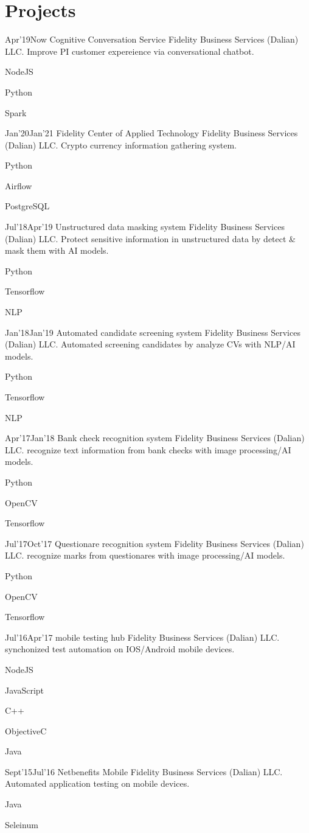 \documentclass[]{lubricy-cv}
\begin{document}
\section{Projects}
\begin{entrylist}
  \entry
    {Apr'19}{Now}
    {Cognitive Conversation Service}
    {Fidelity Business Services (Dalian) LLC.}
    {Improve PI customer expereience via conversational chatbot.}
    {
      \item NodeJS
      \item Python
      \item Spark }
  \entry
    {Jan'20}{Jan'21}
    {Fidelity Center of Applied Technology}
    {Fidelity Business Services (Dalian) LLC.}
    {Crypto currency information gathering system.}
    {
      \item Python
      \item Airflow
      \item PostgreSQL }
  \entry
    {Jul'18}{Apr'19}
    {Unstructured data masking system}
    {Fidelity Business Services (Dalian) LLC.}
    {Protect sensitive information in unstructured data by detect \& mask them with AI models.}
    {
      \item Python
      \item Tensorflow
      \item NLP }
  \entry
    {Jan'18}{Jan'19}
    {Automated candidate screening system}
    {Fidelity Business Services (Dalian) LLC.}
    {Automated screening candidates by analyze CVs with NLP/AI models.}
    {
      \item Python
      \item Tensorflow
      \item NLP}
  \entry
    {Apr'17}{Jan'18}
    {Bank check recognition system}
    {Fidelity Business Services (Dalian) LLC.}
    {recognize text information from bank checks with image processing/AI models.}
    {
      \item Python
      \item OpenCV
      \item Tensorflow}
  \entry
    {Jul'17}{Oct'17}
    {Questionare recognition system}
    {Fidelity Business Services (Dalian) LLC.}
    {recognize marks from questionares with image processing/AI models.}
    {
      \item Python
      \item OpenCV
      \item Tensorflow}
  \entry
    {Jul'16}{Apr'17}
    {mobile testing hub}
    {Fidelity Business Services (Dalian) LLC.}
    {synchonized test automation on IOS/Android mobile devices.}
    {
      \item NodeJS
      \item JavaScript
      \item C++
      \item ObjectiveC
      \item Java}
  \entry
    {Sept'15}{Jul'16}
    {Netbenefits Mobile}
    {Fidelity Business Services (Dalian) LLC.}
    {Automated application testing on mobile devices.}
    {
      \item Java
      \item Seleinum}
\end{entrylist}
~
\end{document}
